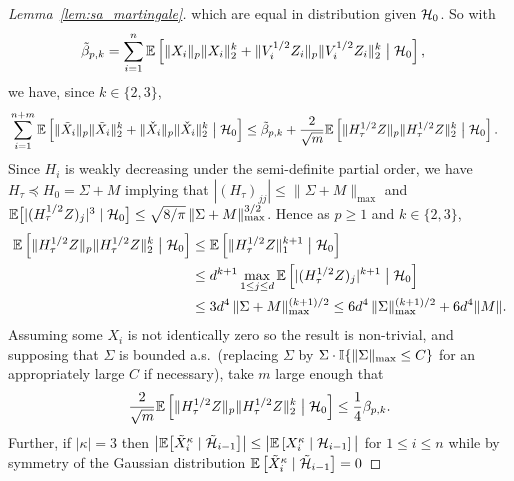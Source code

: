 \begin{proof}[Lemma~\ref{lem:sa_martingale}]
  which are equal in distribution given $\mathcal{H}_0$.
  So with
  \begin{align*}
    \tilde \beta_{p,k}
    &=
    \sum_{i=1}^{n}
    \mathbb{E} \left[
      \|X_i\|_p \|X_i\|_2^k
      + \|V_i^{1/2} Z_i\|_p \|V_i^{1/2} Z_i\|_2^k
      \bigm| \mathcal{H}_0
    \right],
  \end{align*}
  we have, since $k \in \{2,3\}$,
  \begin{align*}
    &\sum_{i=1}^{n+m}
    \mathbb{E} \left[
      \|\tilde X_i\|_p \|\tilde X_i\|_2^k
      + \|\check X_i\|_p \|\check X_i\|_2^k
      \bigm| \mathcal{H}_0
    \right]
    \leq
    \tilde\beta_{p,k}
    + \frac{2}{\sqrt m}
    \mathbb{E} \left[
      \|H_\tau^{1/2} Z\|_p \|H_\tau^{1/2} Z\|_2^k
      \bigm| \mathcal{H}_0
    \right].
  \end{align*}
  Since $H_i$ is weakly decreasing under the
  semi-definite partial order, we have
  $H_\tau \preceq H_0 = \Sigma + M$
  implying that $|(H_\tau)_{j j}| \leq \|\Sigma + M\|_{\max}$ and
  $\mathbb{E}\big[|(H_\tau^{1/2} Z)_j|^3 \mid \mathcal{H}_0 \big]
  \leq \sqrt{8/\pi}\, \|\Sigma + M\|_{\max}^{3/2}$.
  Hence as $p \geq 1$ and $k \in \{2,3\}$,
  \begin{align*}
    \mathbb{E}\left[
      \|H_\tau^{1/2}Z\|_p
      \|H_\tau^{1/2}Z\|_2^k
      \bigm| \mathcal{H}_0
    \right]
    &\leq
    \mathbb{E}\left[\|H_\tau^{1/2} Z\|_1^{k+1}
      \bigm| \mathcal{H}_0
    \right] \\
    &\leq
    d^{k+1} \max_{1\leq j\leq d}
    \mathbb{E}\left[|(H_\tau^{1/2} Z)_j|^{k+1}
      \bigm| \mathcal{H}_0
    \right] \\
    &\leq 3 d^4 \,
    \|\Sigma + M\|_{\max}^{(k+1)/2}
    \leq 6 d^4 \,
    \|\Sigma \|_{\max}^{(k+1)/2}
    + 6 d^4 \|M\|.
  \end{align*}
  Assuming some $X_i$ is not identically zero so
  the result is non-trivial,
  and supposing that $\Sigma$ is bounded a.s.\
  (replacing $\Sigma$ by $\Sigma \cdot \mathbb{I}\{\|\Sigma\|_{\max} \leq C\}$
  for an appropriately large $C$ if necessary),
  take $m$ large enough that
  \begin{align}
    \label{eq:bound_extra_terms}
    \frac{2}{\sqrt m}
    \mathbb{E} \left[
      \|H_\tau^{1/2} Z\|_p \|H_\tau^{1/2} Z\|_2^k
      \bigm| \mathcal{H}_0
    \right]
    \leq
    \frac{1}{4}
    \beta_{p,k}.
  \end{align}
  Further, if $|\kappa| = 3$ then
  $\big|\mathbb{E} \big[
  \tilde X_i^\kappa \mid \tilde {\mathcal{H}}_{i-1} \big]\big|
  \leq \big| \mathbb{E} \left[ X_i^\kappa \mid \mathcal{H}_{i-1} \right]\big|$
  for $1 \leq i \leq n$
  while by symmetry of the Gaussian distribution
  $\mathbb{E} \left[ \tilde X_i^\kappa \mid \tilde {\mathcal{H}}_{i-1} \right] = 0$

\end{proof}
